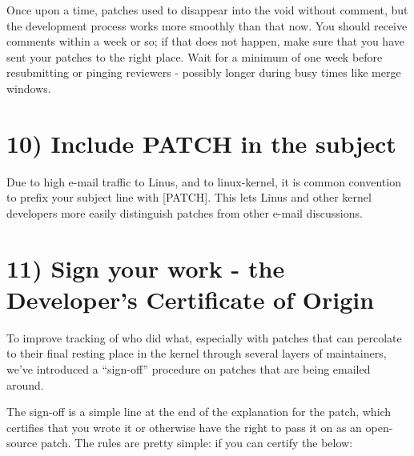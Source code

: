 \documentclass[a4paper,8pt,english]{sphinxmanual}
\begin{document}
Once upon a time, patches used to disappear into the void without comment,
but the development process works more smoothly than that now.  You should
receive comments within a week or so; if that does not happen, make sure
that you have sent your patches to the right place.  Wait for a minimum of
one week before resubmitting or pinging reviewers - possibly longer during
busy times like merge windows.


\section{10) Include PATCH in the subject}
\label{process/submitting-patches:include-patch-in-the-subject}
Due to high e-mail traffic to Linus, and to linux-kernel, it is common
convention to prefix your subject line with {[}PATCH{]}.  This lets Linus
and other kernel developers more easily distinguish patches from other
e-mail discussions.


\section{11) Sign your work - the Developer's Certificate of Origin}
\label{process/submitting-patches:sign-your-work-the-developer-s-certificate-of-origin}
To improve tracking of who did what, especially with patches that can
percolate to their final resting place in the kernel through several
layers of maintainers, we've introduced a ``sign-off'' procedure on
patches that are being emailed around.

The sign-off is a simple line at the end of the explanation for the
patch, which certifies that you wrote it or otherwise have the right to
pass it on as an open-source patch.  The rules are pretty simple: if you
can certify the below:
\end{document}
